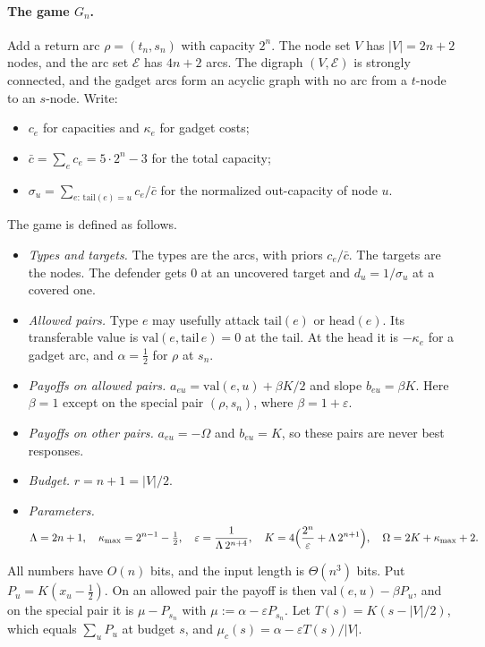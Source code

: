 \paragraph{The game $G_n$.} Add a return arc $\rho=(t_n,s_n)$ with capacity $2^n$. The node set $V$ has
$|V|=2n+2$ nodes, and the arc set $\mathcal E$ has $4n+2$ arcs. The digraph $(V,\mathcal E)$ is strongly
connected, and the gadget arcs form an acyclic graph with no arc from a $t$-node to an $s$-node. Write:
\begin{itemize}[nosep]
\item $c_e$ for capacities and $\kappa_e$ for gadget costs;
\item $\bar c=\sum_ec_e=5\cdot2^n-3$ for the total capacity;
\item $\sigma_u=\sum_{e:\,\mathrm{tail}(e)=u}c_e/\bar c$ for the normalized out-capacity of node $u$.
\end{itemize}
The game is defined as follows.
\begin{itemize}[nosep]
\item \emph{Types and targets.} The types are the arcs, with priors $c_e/\bar c$. The targets are the
nodes. The defender gets $0$ at an uncovered target and $d_u=1/\sigma_u$ at a covered one.
\item \emph{Allowed pairs.} Type $e$ may usefully attack $\mathrm{tail}(e)$ or $\mathrm{head}(e)$. Its
transferable value is $\mathrm{val}(e,\mathrm{tail}\,e)=0$ at the tail. At the head it is $-\kappa_e$ for a
gadget arc, and $\alpha=\tfrac12$ for $\rho$ at $s_n$.
\item \emph{Payoffs on allowed pairs.} $a_{eu}=\mathrm{val}(e,u)+\beta K/2$ and slope $b_{eu}=\beta K$.
Here $\beta=1$ except on the special pair $(\rho,s_n)$, where $\beta=1+\varepsilon$.
\item \emph{Payoffs on other pairs.} $a_{eu}=-\Omega$ and $b_{eu}=K$, so these pairs are never best
responses.
\item \emph{Budget.} $r=n+1=|V|/2$.
\item \emph{Parameters.}
\[
 \Lambda=2n+1,\quad \kappa_{\max}=2^{n-1}-\tfrac12,\quad \varepsilon=\frac1{\Lambda\,2^{n+4}},\quad K=4\Bigl(\frac{2^n}{\varepsilon}+\Lambda\,2^{n+1}\Bigr),\quad \Omega=2K+\kappa_{\max}+2 .
\]
\end{itemize}
All numbers have $O(n)$ bits, and the input length is $\Theta(n^3)$ bits. Put $P_u=K(x_u-\frac12)$. On an
allowed pair the payoff is then $\mathrm{val}(e,u)-\beta P_u$, and on the special pair it is
$\mu-P_{s_n}$ with $\mu:=\alpha-\varepsilon P_{s_n}$. Let $T(s)=K(s-|V|/2)$, which equals $\sum_uP_u$ at
budget $s$, and $\mu_c(s)=\alpha-\varepsilon T(s)/|V|$.


